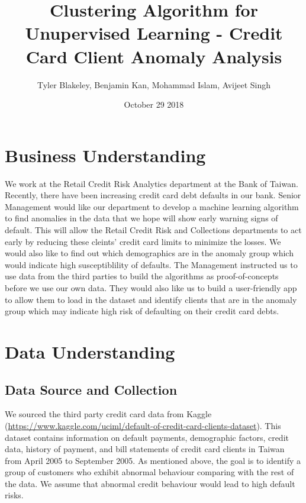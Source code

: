 \documentclass[]{article}
\title{Clustering Algorithm for Unupervised Learning - Credit Card Client
Anomaly Analysis}
\author{Tyler Blakeley, Benjamin Kan, Mohammad Islam, Avijeet Singh}
\date{October 29 2018}
\begin{document}
\maketitle

{
\setcounter{tocdepth}{2}
\tableofcontents
}
\section{Business Understanding}\label{business-understanding}

We work at the Retail Credit Risk Analytics department at the Bank of
Taiwan. Recently, there have been increasing credit card debt defaults
in our bank. Senior Management would like our department to develop a
machine learning algorithm to find anomalies in the data that we hope
will show early warning signs of default. This will allow the Retail
Credit Risk and Collections departments to act early by reducing these
cleints' credit card limits to minimize the losses. We would also like
to find out which demographics are in the anomaly group which would
indicate high susceptiblility of defaults. The Management instructed us
to use data from the third parties to build the algorithms as
proof-of-concepts before we use our own data. They would also like us to
build a user-friendly app to allow them to load in the dataset and
identify clients that are in the anomaly group which may indicate high
risk of defaulting on their credit card debts.

\section{Data Understanding}\label{data-understanding}

\subsection{Data Source and
Collection}\label{data-source-and-collection}

We sourced the third party credit card data from Kaggle
(\url{https://www.kaggle.com/uciml/default-of-credit-card-clients-dataset}).
This dataset contains information on default payments, demographic
factors, credit data, history of payment, and bill statements of credit
card clients in Taiwan from April 2005 to September 2005. As mentioned
above, the goal is to identify a group of customers who exhibit abnormal
behaviour comparing with the rest of the data. We assume that abnormal
credit behaviour would lead to high default risks.
\end{document}
